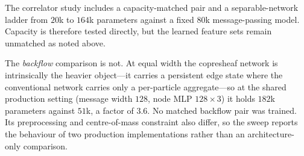 The correlator study includes a capacity-matched pair and a separable-network ladder from
$20$k to $164$k parameters against a fixed $80$k message-passing model. Capacity is therefore
tested directly, but the learned feature sets remain unmatched as noted above.

The \emph{backflow} comparison is not. At equal width the copresheaf network is intrinsically
the heavier object---it carries a persistent edge state where the conventional network carries
only a per-particle aggregate---so at the shared production setting (message width $128$,
node MLP $128\times3$) it holds $182$k parameters against $51$k, a factor of $3.6$. No
matched backflow pair was trained. Its preprocessing and centre-of-mass constraint also
differ, so the sweep reports the behaviour of two production implementations rather than an
architecture-only comparison.

